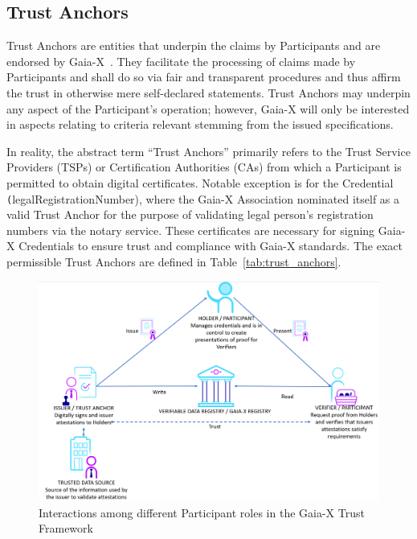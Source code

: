 \subsection{Trust Anchors}\label{subsec:trust-anchors}

Trust Anchors are entities that underpin the claims by Participants and are endorsed by Gaia-X~\cite{gaiax_trust_framework}.
They facilitate the processing of claims made by Participants and shall do so via fair and transparent procedures and thus affirm the trust in otherwise mere self-declared statements.
Trust Anchors may underpin any aspect of the Participant's operation; however, Gaia-X will only be interested in aspects relating to criteria relevant stemming from the issued specifications.

In reality, the abstract term ``Trust Anchors'' primarily refers to the Trust Service Providers (TSPs) or Certification Authorities (CAs) from which a Participant is permitted to obtain digital certificates.
Notable exception is for the Credential \texttt(legalRegistrationNumber), where the Gaia-X Association nominated itself as a valid Trust Anchor for the purpose of validating legal person's registration numbers via the notary service.
These certificates are necessary for signing Gaia-X Credentials to ensure trust and compliance with Gaia-X standards.
The exact permissible Trust Anchors are defined in Table~\ref{tab:trust_anchors}.

\begin{figure}
    \centering
    \includegraphics[width=\textwidth]{figures/vc_model.png}
    \caption{Interactions among different Participant roles in the Gaia-X Trust Framework~\cite{gaiax_trust_framework}}\label{fig:trust_framework_interactions}
\end{figure}

